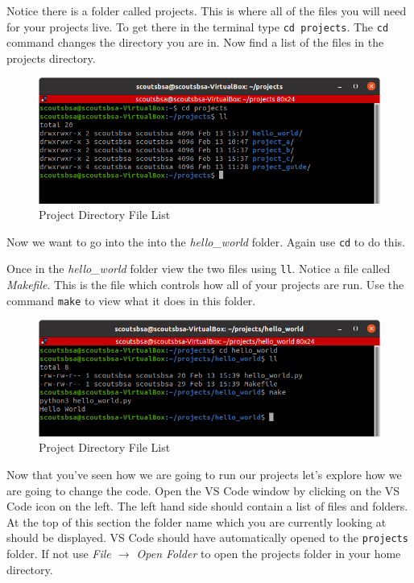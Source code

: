     \FloatBarrier

    Notice there is a folder called projects.
    This is where all of the files you will need for your projects live.
    To get there in the terminal type \texttt{cd projects}.
    The \texttt{cd} command changes the directory you are in.
    Now find a list of the files in the projects directory.

    \begin{figure}[ht]
      \centering
      \includegraphics[width=0.8\linewidth]{projects_file_list.png}
      \caption{Project Directory File List}
      \label{fig:proj_file_list}
    \end{figure}

    \FloatBarrier

    Now we want to go into the into the \textit{hello\_world} folder.
    Again use \texttt{cd} to do this.

    Once in the \textit{hello\_world} folder view the two files using \texttt{ll}.
    Notice a file called \textit{Makefile}.
    This is the file which controls how all of your projects are run.
    Use the command \texttt{make} to view what it does in this folder.

    \begin{figure}[ht]
      \centering
      \includegraphics[width=0.8\linewidth]{hello_world.png}
      \caption{Project Directory File List}
      \label{fig:hello_world_example}
    \end{figure}

    \FloatBarrier

    Now that you've seen how we are going to run our projects let's explore how we are going
      to change the code.
    Open the VS Code window by clicking on the VS Code icon on the left.
    The left hand side should contain a list of files and folders.
    At the top of this section the folder name which you are currently looking at 
      should be displayed.
    VS Code should have automatically opened to the \texttt{projects} folder.
    If not use \textit{File $\rightarrow$ Open Folder} to open the projects folder in your home directory.

